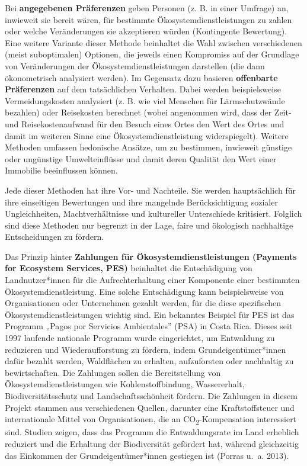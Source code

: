 \documentclass[
  nswissgerman,
  a4paper,
  openany]{book}
\begin{document}
Bei \textbf{angegebenen Präferenzen} geben Personen (z. B. in einer
Umfrage) an, inwieweit sie bereit wären, für bestimmte
Ökosystemdienstleistungen zu zahlen oder welche Veränderungen sie
akzeptieren würden (Kontingente Bewertung). Eine weitere Variante dieser
Methode beinhaltet die Wahl zwischen verschiedenen (meist suboptimalen)
Optionen, die jeweils einen Kompromiss auf der Grundlage von
Veränderungen der Ökosystemdienstleistungen darstellen (die dann
ökonometrisch analysiert werden). Im Gegensatz dazu basieren
\textbf{offenbarte Präferenzen} auf dem tatsächlichen Verhalten. Dabei
werden beispielsweise Vermeidungskosten analysiert (z. B. wie viel
Menschen für Lärmschutzwände bezahlen) oder Reisekosten berechnet (wobei
angenommen wird, dass der Zeit- und Reisekostenaufwand für den Besuch
eines Ortes den Wert des Ortes und damit im weiteren Sinne eine
Ökosystemdienstleistung widerspiegelt). Weitere Methoden umfassen
hedonische Ansätze, um zu bestimmen, inwieweit günstige oder ungünstige
Umwelteinflüsse und damit deren Qualität den Wert einer Immobilie
beeinflussen können.

Jede dieser Methoden hat ihre Vor- und Nachteile. Sie werden
hauptsächlich für ihre einseitigen Bewertungen und ihre mangelnde
Berücksichtigung sozialer Ungleichheiten, Machtverhältnisse und
kultureller Unterschiede kritisiert. Folglich sind diese Methoden nur
begrenzt in der Lage, faire und ökologisch nachhaltige Entscheidungen zu
fördern.

Das Prinzip hinter \textbf{Zahlungen für Ökosystemdienstleistungen
(Payments for Ecosystem Services, PES)} beinhaltet die Entschädigung von
Landnutzer*innen für die Aufrechterhaltung einer Komponente einer
bestimmten Ökosystemdienstleistung. Eine solche Entschädigung kann
beispielsweise von Organisationen oder Unternehmen gezahlt werden, für
die diese spezifischen Ökosystemdienstleistungen wichtig sind. Ein
bekanntes Beispiel für PES ist das Programm „Pagos por Servicios
Ambientales'' (PSA) in Costa Rica. Dieses seit 1997 laufende nationale
Programm wurde eingerichtet, um Entwaldung zu reduzieren und
Wiederaufforstung zu fördern, indem Grundeigentümer*innen dafür bezahlt
werden, Waldflächen zu erhalten, aufzuforsten oder nachhaltig zu
bewirtschaften. Die Zahlungen sollen die Bereitstellung von
Ökosystemdienstleistungen wie Kohlenstoffbindung, Wassererhalt,
Biodiversitätsschutz und Landschaftsschönheit fördern. Die Zahlungen in
diesem Projekt stammen aus verschiedenen Quellen, darunter eine
Kraftstoffsteuer und internationale Mittel von Organisationen, die an
CO\textsubscript{2}-Kompensation interessiert sind. Studien zeigen, dass
das Programm die Entwaldungsrate im Land erheblich reduziert und die
Erhaltung der Biodiversität gefördert hat, während gleichzeitig das
Einkommen der Grundeigentümer*innen gestiegen ist (Porras u.~a. 2013).
\end{document}
